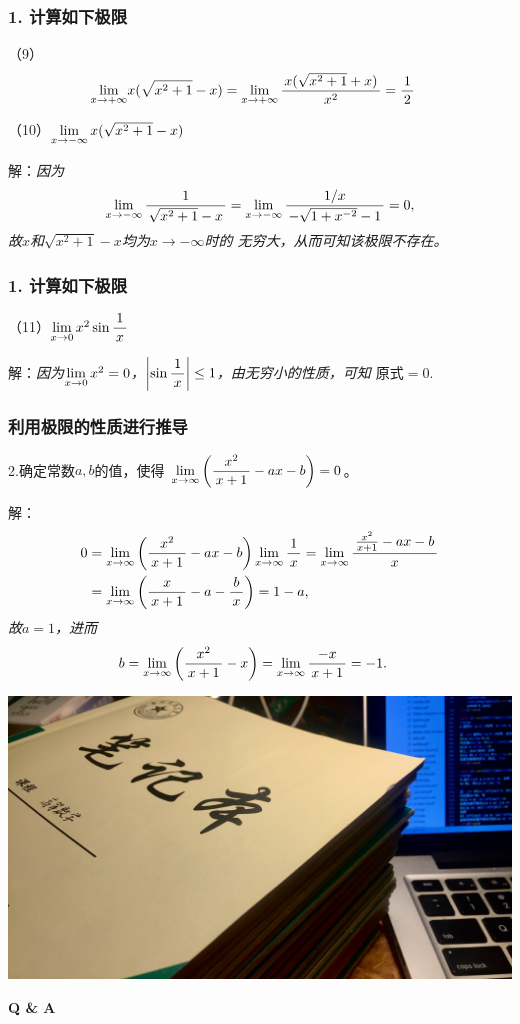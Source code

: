 \begin{frame}[t]\frametitle{1. 计算如下极限}
\large
（9）
\begin{align*}
	\lim\limits_{x\to{+\infty}}&x(\sqrt{x^2+1}-x)
	=\lim\limits_{x\to{+\infty}}\displaystyle\frac{\,{x(\sqrt{x^2+1}+x)}\,}{\,{x^2}\,}=\displaystyle\frac{\,{1}\,}{\,{2}\,}
\end{align*}

\bs
（10）$\lim\limits_{x\to{-\infty}}x(\sqrt{x^2+1}-x)$

解：{\it 因为
$$\lim\limits_{x\to{-\infty}}\displaystyle\frac{\,{1}\,}{\,{\sqrt{x^2+1}-x}\,}
=\lim\limits_{x\to{-\infty}}\displaystyle\frac{\,{1/x}\,}{\,{-\sqrt{1+x^{-2}}-1}\,}=0,$$
故$x$和$\sqrt{x^2+1}-x$均为$x\to-\infty$时的
无穷大，从而可知该极限不存在。}
\end{frame}

\begin{frame}[t]\frametitle{1. 计算如下极限}
\large
（11）$\lim\limits_{x\to{0}}x^2\sin\displaystyle\frac{\,{1}\,}{\,{x}\,}$

解：{\it 因为$\lim\limits_{x\to{0}}x^2=0$，$\left|\sin\displaystyle\frac{\,{1}\,}{\,{x}\,}\right|\leq1$，由无穷小的性质，可知
$\mbox{原式}=0.$}
\end{frame}

\begin{frame}[t]\frametitle{利用极限的性质进行推导}
\large
2.确定常数$a,b$的值，使得
$\lim\limits_{x\to{\infty}}\left(\displaystyle\frac{\,{x^2}\,}{\,{x+1}\,}-ax-b\right)=0$。

解：\it
\begin{align*}
	0&=\lim\limits_{x\to{\infty}}\left(\displaystyle\frac{\,{x^2}\,}{\,{x+1}\,}-ax-b\right)\lim\limits_{x\to{\infty}}\displaystyle\frac{\,{1}\,}{\,{x}\,}
	=\lim\limits_{x\to{\infty}}\displaystyle\frac{\,{\frac{x^2}{x+1}-ax-b}\,}{\,{x}\,}\\
	&=\lim\limits_{x\to{\infty}}\left(\displaystyle\frac{\,{x}\,}{\,{x+1}\,}-a-\displaystyle\frac{\,{b}\,}{\,{x}\,}\right)
	=1-a,
\end{align*}
故$a=1$，进而
\begin{align*}
	b&=\lim\limits_{x\to{\infty}}\left(\displaystyle\frac{\,{x^2}\,}{\,{x+1}\,}-x\right)
	=\lim\limits_{x\to{\infty}}\displaystyle\frac{\,{-x}\,}{\,{x+1}\,}=-1.
\end{align*}
\fin
\end{frame}

\begin{frame}
	\centering
	\includegraphics[width=\textwidth]{./images/ch01/HWR/notebook.jpg}

	\begin{flushright}
		\color{white}\vspace*{-2cm}
		\Huge\bf Q \& A
	\end{flushright}
\end{frame}